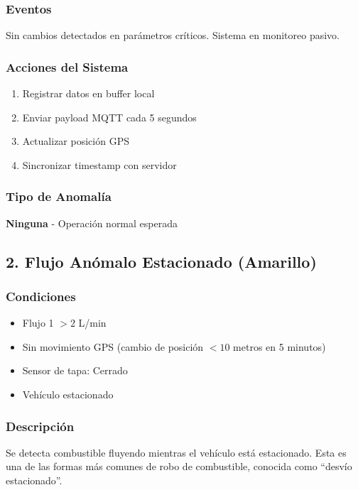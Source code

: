\documentclass[12pt,a4paper,oneside]{report}
\begin{document}
\subsubsection{Eventos}

Sin cambios detectados en parámetros críticos. Sistema en monitoreo pasivo.

\subsubsection{Acciones del Sistema}

\begin{enumerate}
    \item Registrar datos en buffer local
    \item Enviar payload MQTT cada 5 segundos
    \item Actualizar posición GPS
    \item Sincronizar timestamp con servidor
\end{enumerate}

\subsubsection{Tipo de Anomalía}

\textbf{Ninguna} - Operación normal esperada

\subsection{2. Flujo Anómalo Estacionado (Amarillo)}

\subsubsection{Condiciones}

\begin{itemize}
    \item Flujo 1 $> 2$ L/min
    \item Sin movimiento GPS (cambio de posición $< 10$ metros en 5 minutos)
    \item Sensor de tapa: Cerrado
    \item Vehículo estacionado
\end{itemize}

\subsubsection{Descripción}

Se detecta combustible fluyendo mientras el vehículo está estacionado. Esta es una de las formas más comunes de robo de combustible, conocida como ``desvío estacionado''.
\end{document}
